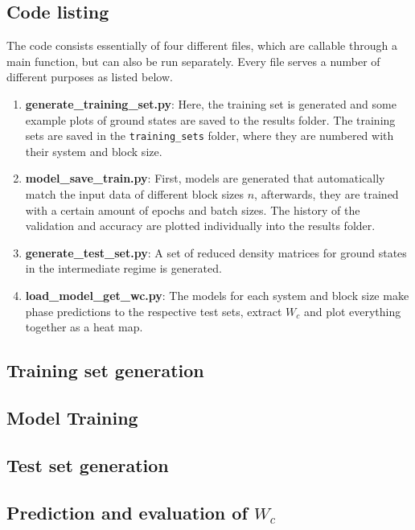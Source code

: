 \documentclass[reprint,amsmath,amssymb,aps,prb]{revtex4-2}
\begin{document}
\begin{widetext}
\section{Code listing} \label{app:codes}
The code consists essentially of four different files, which are callable through a main function, but can also be run separately. Every file serves a number of different purposes as listed below.

\begin{enumerate}
	\item \textbf{generate\_training\_set.py}: Here, the training set is generated and some example plots of ground states are saved to the results folder. The training sets are saved in the \texttt{training\_sets} folder, where they are numbered with their system and block size.
	\item \textbf{model\_save\_train.py}: First, models are generated that automatically match the input data of different block sizes $n$, afterwards, they are trained with a certain amount of epochs and batch sizes. The history of the validation and accuracy are plotted individually into the results folder.
	\item \textbf{generate\_test\_set.py}: A set of reduced density matrices for ground states in the intermediate regime is generated.
	\item \textbf{load\_model\_get\_wc.py}: The models for each system and block size make phase predictions to the respective test sets, extract $W_c$ and plot everything together as a heat map.
\end{enumerate}

\subsection{Training set generation}


\subsection{Model Training}


\subsection{Test set generation}


\subsection{Prediction and evaluation of $W_c$}

%
\end{widetext}
\end{document}

